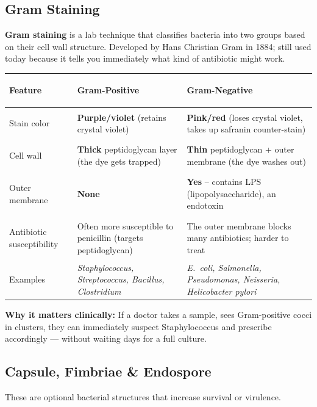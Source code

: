 \documentclass[11pt, letterpaper]{article}
\begin{document}
\subsection*{Gram Staining}

\textbf{Gram staining} is a lab technique that classifies bacteria into two groups based
on their cell wall structure. Developed by Hans Christian Gram in 1884; still used today
because it tells you immediately what kind of antibiotic might work.

\noindent
{\renewcommand{\arraystretch}{1.6}
\begin{tabularx}{\textwidth}{>{\bfseries\raggedright\arraybackslash}p{3cm}
                              >{\raggedright\arraybackslash}X
                              >{\raggedright\arraybackslash}X}
\toprule
\rowcolor{tableheaderorange}
\textbf{Feature} & \textbf{Gram-Positive} & \textbf{Gram-Negative} \\
\midrule
\rowcolor{rowOr} Stain color    & \textbf{Purple/violet} (retains crystal violet) & \textbf{Pink/red} (loses crystal violet, takes up safranin counter-stain) \\
\rowcolor{rowA}  Cell wall      & \textbf{Thick} peptidoglycan layer (the dye gets trapped) & \textbf{Thin} peptidoglycan + outer membrane (the dye washes out) \\
\rowcolor{rowOr} Outer membrane & \textbf{None}                                    & \textbf{Yes} -- contains LPS (lipopolysaccharide), an endotoxin \\
\rowcolor{rowA}  Antibiotic susceptibility & Often more susceptible to penicillin (targets peptidoglycan) & The outer membrane blocks many antibiotics; harder to treat \\
\rowcolor{rowOr} Examples       & \textit{Staphylococcus, Streptococcus, Bacillus, Clostridium} & \textit{E.\ coli, Salmonella, Pseudomonas, Neisseria, Helicobacter pylori} \\
\bottomrule
\end{tabularx}}

\textbf{Why it matters clinically:} If a doctor takes a sample, sees Gram-positive cocci
in clusters, they can immediately suspect Staphylococcus and prescribe accordingly --- without
waiting days for a full culture.

\subsection*{Capsule, Fimbriae \& Endospore}

These are optional bacterial structures that increase survival or virulence.
\end{document}
